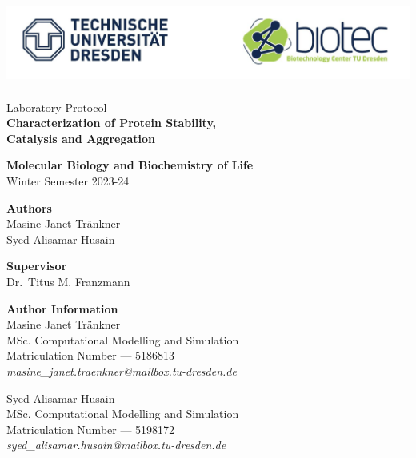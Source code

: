 \documentclass[a4paper,10pt]{article}
\begin{document}
    \begin{titlepage}
        \begin{center}
            \includegraphics[height=7.5em]{../resources/unilogo.png}
            
            \vspace{10em}
            {\LARGE Laboratory Protocol} \\ 
            {\huge\bfseries Characterization of Protein Stability,\\ Catalysis and Aggregation}
            
            \vspace{5em}
            {\large\bfseries Molecular Biology and Biochemistry of Life}\\
            {\large Winter Semester 2023-24}
            
            \vspace{12em}
            {\bfseries Authors} \\ 
            Masine Janet Tränkner\\
            Syed Alisamar Husain
            
            \vspace{5em}
            {\bfseries Supervisor} \\ Dr.\ Titus M. Franzmann
        \end{center}
    \end{titlepage}
    \pagebreak

    \tableofcontents
    \listoffigures
    \vspace{3em}
    {\noindent\Large\bfseries Author Information \vspace{0.75em}}\\
    \noindent\large Masine Janet Tränkner\\
    {\small MSc. Computational Modelling and Simulation}\\
    {\small Matriculation Number --- 5186813}\\
    {\it\small masine\_janet.traenkner@mailbox.tu-dresden.de}\\\vspace{0.5em}
    
    \noindent\large Syed Alisamar Husain\\
    {\small MSc. Computational Modelling and Simulation}\\
    {\small Matriculation Number --- 5198172}\\
    {\it\small syed\_alisamar.husain@mailbox.tu-dresden.de}
    \pagebreak
\end{document}
